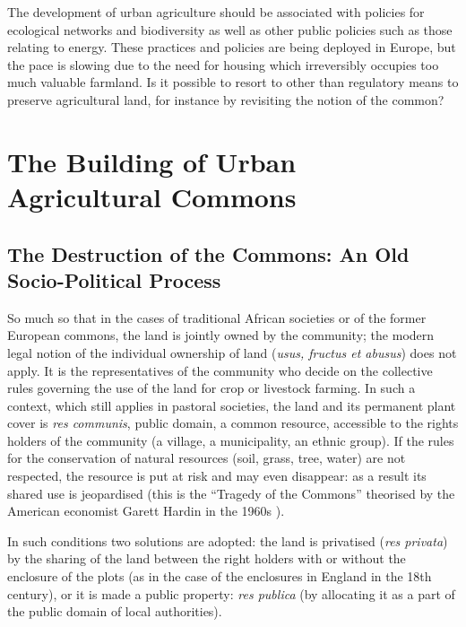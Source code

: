 \documentclass[10pt,a4paper]{article}
\begin{document}
\begin{multicols}{2}
The development of urban agriculture should be associated with policies for ecological networks and biodiversity as well as other public policies such as those relating to energy. These practices and policies are being deployed in Europe, but the pace is slowing due to the need for housing which irreversibly occupies too much valuable farmland. Is it possible to resort to other than regulatory means to preserve agricultural land, for instance by revisiting the notion of the common?

\section{The Building of Urban Agricultural Commons}
\subsection{The Destruction of the Commons: An Old Socio-Political Process}
\noindent {}

So much so that in the cases of traditional African societies or of the former European commons, the land is jointly owned by the community; the modern legal notion of the individual ownership of land (\textit{usus, fructus et abusus}) does not apply. It is the representatives of the community who decide on the collective rules governing the use of the land for crop or livestock farming. In such a context, which still applies in pastoral societies, the land and its permanent plant cover is \textit{res communis}, public domain, a common resource, accessible to the rights holders of the community (a village, a municipality, an ethnic group). If the rules for the conservation of natural resources (soil, grass, tree, water) are not respected, the resource is put at risk and may even disappear: as a result its shared use is jeopardised (this is the ``Tragedy of the Commons'' theorised by the American economist Garett Hardin in the 1960s \citep{r12}).

In such conditions two solutions are adopted: the land is privatised (\textit{res privata}) by the sharing of the land between the right holders with or without the enclosure of the plots (as in the case of the enclosures in England in the 18th century), or it is made a public property: \textit{res publica} (by allocating it as a part of the public domain of local authorities).


\end{multicols}
\end{document}
